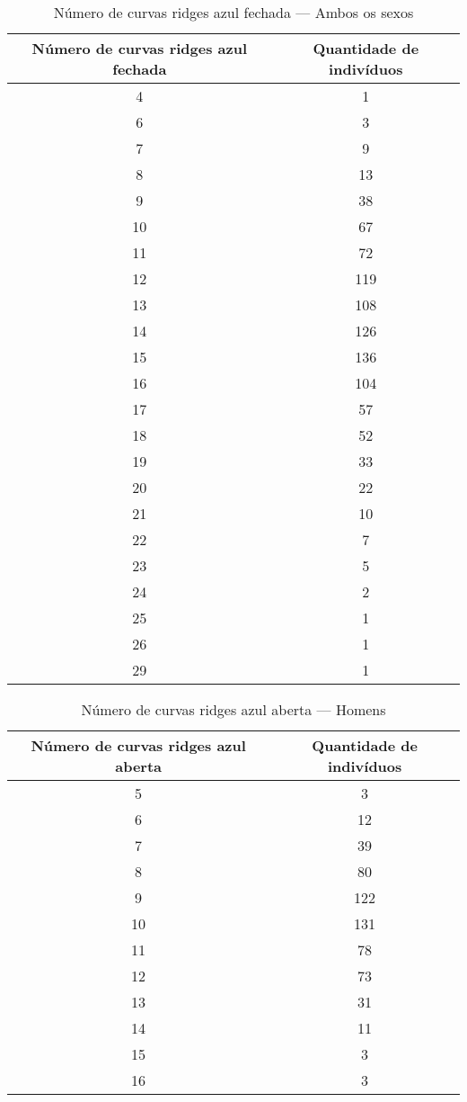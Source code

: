 \documentclass[a4paper,12pt]{article}
\begin{document}
\begin{table}[h!]
\centering
\caption{Número de curvas ridges azul fechada — Ambos os sexos}
\begin{tabular}{c c}
\hline
\textbf{Número de curvas ridges azul fechada} & \textbf{Quantidade de indivíduos} \\ 
\hline
4  & 1   \\
6  & 3   \\
7  & 9   \\
8  & 13  \\
9  & 38  \\
10 & 67  \\
11 & 72  \\
12 & 119 \\
13 & 108 \\
14 & 126 \\
15 & 136 \\
16 & 104 \\
17 & 57  \\
18 & 52  \\
19 & 33  \\
20 & 22  \\
21 & 10  \\
22 & 7   \\
23 & 5   \\
24 & 2   \\
25 & 1   \\
26 & 1   \\
29 & 1   \\
\hline
\end{tabular}
\end{table}


\begin{table}[h!]
\centering
\caption{Número de curvas ridges azul aberta — Homens}
\begin{tabular}{c c}
\hline
\textbf{Número de curvas ridges azul aberta} & \textbf{Quantidade de indivíduos} \\ 
\hline
5  & 3   \\
6  & 12  \\
7  & 39  \\
8  & 80  \\
9  & 122 \\
10 & 131 \\
11 & 78  \\
12 & 73  \\
13 & 31  \\
14 & 11  \\
15 & 3   \\
16 & 3   \\
\hline
\end{tabular}
\end{table}
\end{document}
